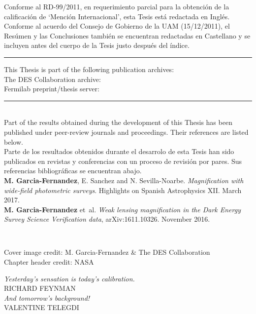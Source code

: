 \documentclass[12pt]{book} %
\begin{document}
\noindent
Conforme al RD-99/2011, en requerimiento parcial para la obtenci\'on de la calificaci\'on  de `Menci\'on Internacional', esta Tesis est\'a redactada en Ingl\'es.\\
Conforme al acuerdo del Consejo de Gobierno de la UAM (15/12/2011), el Res\'umen y las Conclusiones tambi\'en se encuentran redactadas en Castellano y se incluyen antes del cuerpo de la Tesis justo despu\'es del \'indice.
\vspace*{2cm}
\begin{flushleft}
\rule{\textwidth}{2pt}
This Thesis is part of the following publication archives:\\
The DES Collaboration archive:\\
Fermilab preprint/thesis server:\\
\rule{\textwidth}{2pt}\\
\vspace*{2cm}
\noindent
Part of the results obtained during the development of this Thesis has been published under peer-review journals and proceedings. Their references are listed below.\\

\noindent
Parte de los resultados obtenidos durante el desarrolo de esta Tesis han sido publicados en revistas y conferencias con un proceso de revisi\'on por pares. Sus referencias bibliogr\'aficas se encuentran abajo.\\
\vspace*{0.5cm}
{\bf M. Garcia-Fernandez}, E. Sanchez and N. Sevilla-Noarbe. {\it Magnification with wide-field photometric surveys}. Highlights on Spanish Astrophysics XII. March 2017.\\
\vspace*{0.5cm}
{\bf M. Garcia-Fernandez} et~al. {\it Weak lensing magnification in the Dark Energy Survey Science Verification data}, arXiv:1611.10326. November 2016.

~\vfill
\thispagestyle{empty}
\begin{footnotesize}
Cover image credit: M. Garcia-Fernandez \& The DES Collaboration\\
Chapter header credit: NASA
\end{footnotesize}
\end{flushleft}

\newpage
\thispagestyle{empty}
\begin{flushright}
\begin{large}
\vspace*{3cm}
{\it Yesterday's sensation is today's calibration.}\\
RICHARD FEYNMAN\\
\vspace{1cm}
{\it And tomorrow's background!}\\
VALENTINE TELEGDI\\
\end{large}
~\vfill
\end{flushright}
\end{document}
